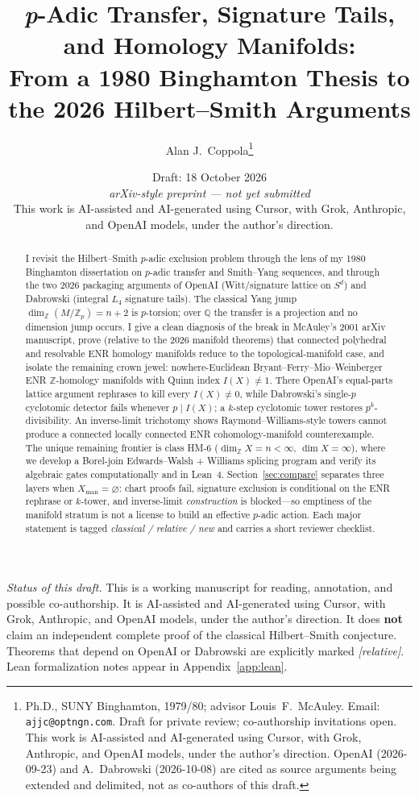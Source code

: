 \documentclass[11pt]{article}
\title{\textit{p}-Adic Transfer, Signature Tails, and Homology Manifolds:\\
From a 1980 Binghamton Thesis to the 2026 Hilbert--Smith Arguments}
\author{Alan J.\ Coppola\thanks{%
Ph.D., SUNY Binghamton, 1979/80; advisor Louis~F.\ McAuley.
Email: \texttt{ajjc@optngn.com}.
Draft for private review; co-authorship invitations open.
This work is AI-assisted and AI-generated using Cursor, with Grok,
Anthropic, and OpenAI models, under the author's direction.
OpenAI (2026-09-23) and A.~Dabrowski (2026-10-08) are cited as source
arguments being extended and delimited, not as co-authors of this draft.}}
\date{Draft: 18 October 2026\\[0.4em]
\small\textit{arXiv-style preprint --- not yet submitted}\\[0.5em]
\footnotesize This work is AI-assisted and AI-generated using Cursor, with Grok,
Anthropic, and OpenAI models, under the author's direction.}
\theoremstyle{definition}
\newcommand{\status}[1]{\textit{\textcolor{black!70}{[#1]}}}
\begin{document}
\maketitle

\begin{abstract}
I revisit the Hilbert--Smith $p$-adic exclusion problem through the lens of my
1980 Binghamton dissertation on $p$-adic transfer and Smith--Yang sequences,
and through the two 2026 packaging arguments of OpenAI (Witt/signature lattice
on $S^d$) and Dabrowski (integral $L_4$ signature tails).  The classical
Yang jump $\dim_{\mathbb{Z}}(M/\mathbb{Z}_p)=n+2$ is $p$-torsion; over
$\mathbb{Q}$ the transfer is a projection and no dimension jump occurs.
I give a clean diagnosis of the break in McAuley's 2001 arXiv manuscript,
prove (relative to the 2026 manifold theorems) that connected polyhedral and
resolvable ENR homology manifolds reduce to the topological-manifold case,
and isolate the remaining crown jewel: nowhere-Euclidean Bryant--Ferry--Mio--Weinberger
ENR $\mathbb{Z}$-homology manifolds with Quinn index $I(X)\neq 1$.
There OpenAI's equal-parts lattice argument rephrases to kill every $I(X)\neq 0$,
while Dabrowski's single-$p$ cyclotomic detector fails whenever $p\mid I(X)$;
a $k$-step cyclotomic tower restores $p^k$-divisibility.
An inverse-limit trichotomy shows Raymond--Williams-style towers cannot produce
a connected locally connected ENR cohomology-manifold counterexample.
The unique remaining frontier is class HM-6
($\dim_{\mathbb{Z}}X=n<\infty$, $\dim X=\infty$), where we develop a
Borel-join Edwards--Walsh + Williams splicing program and verify its algebraic
gates computationally and in Lean~4.
Section~\ref{sec:compare} separates three layers when
$X_{\mathrm{man}}=\varnothing$: chart proofs fail, signature exclusion is
conditional on the ENR rephrase or $k$-tower, and inverse-limit
\emph{construction} is blocked---so emptiness of the manifold stratum is not
a license to build an effective $p$-adic action.  Each major statement is tagged
\textit{classical / relative / new} and carries a short reviewer checklist.
\end{abstract}

\tableofcontents
\vspace{1em}
\noindent\textit{Status of this draft.}
This is a working manuscript for reading, annotation, and possible co-authorship.
It is AI-assisted and AI-generated using Cursor, with Grok, Anthropic, and
OpenAI models, under the author's direction.
It does \textbf{not} claim an independent complete proof of the classical
Hilbert--Smith conjecture.  Theorems that depend on OpenAI or Dabrowski are
explicitly marked \status{relative}.  Lean formalization notes appear in
Appendix~\ref{app:lean}.
\end{document}
